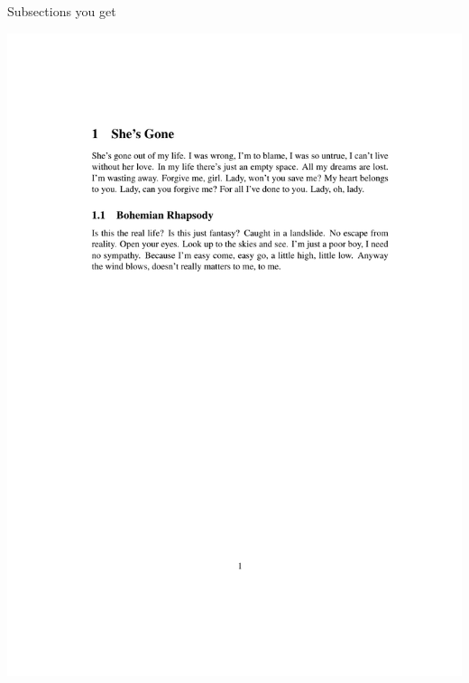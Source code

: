 \documentclass[12pt]{gshs_lecture}
\begin{document}
\begin{frame}[t]{Subsections}\small
you get
\begin{center}
\begin{framed}
\includegraphics[width=\textwidth,trim={1cm 18cm 1cm 4cm},clip]{./test_article/article003.pdf}
\end{framed}
\end{center}
\end{frame}
\end{document}
